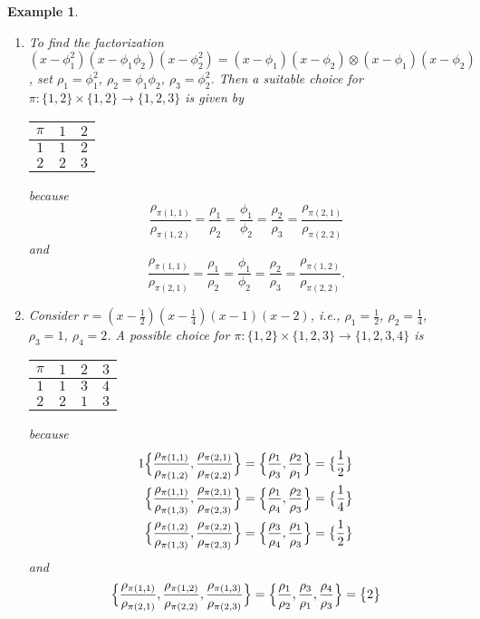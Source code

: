 \documentclass{sig-alternate}
\newtheorem{example}[theorem]{Example}
\begin{document}
\begin{example}
  \begin{enumerate}
  \item To find the factorization $(x-\phi_1^2)(x-\phi_1\phi_2)(x-\phi_2^2)=
    (x-\phi_1)(x-\phi_2)\otimes(x-\phi_1)(x-\phi_2)$,
    set $\rho_1=\phi_1^2$, $\rho_2=\phi_1\phi_2$, $\rho_3=\phi_2^2$. Then
    a suitable choice for $\pi\colon\{1,2\}\times\{1,2\}\to\{1,2,3\}$ is
    given by
    \begin{center}
      \begin{tabular}{c|cc}
        $\pi$ & $1$ & $2$ \\\hline
        $1$ & $1$ & $2$ \\
        $2$ & $2$ & $3$ 
      \end{tabular}
    \end{center}
    because
    \[
       \frac{\rho_{\pi(1,1)}}{\rho_{\pi(1,2)}}
       = \frac{\rho_1}{\rho_2} = \frac{\phi_1}{\phi_2}
       = \frac{\rho_2}{\rho_3}
       = \frac{\rho_{\pi(2,1)}}{\rho_{\pi(2,2)}}
    \]
    and
    \[
    \frac{\rho_{\pi(1,1)}}{\rho_{\pi(2,1)}}
    = \frac{\rho_1}{\rho_2} = \frac{\phi_1}{\phi_2}
    = \frac{\rho_2}{\rho_3}
    = \frac{\rho_{\pi(1,2)}}{\rho_{\pi(2,2)}}.
    \]
  \item
    Consider $r=(x-\tfrac12)(x-\tfrac14)(x-1)(x-2)$, i.e.,
    $\rho_1=\frac12$, $\rho_2=\frac14$, $\rho_3=1$, $\rho_4=2$. A possible
    choice for $\pi\colon\{1,2\}\times\{1,2,3\}\to\{1,2,3,4\}$ is
    \begin{center}
      \begin{tabular}{c|ccc}
        $\pi$ & $1$ & $2$ & $3$ \\\hline
          $1$ & $1$ & $3$ & $4$ \\
          $2$ & $2$ & $1$ & $3$
      \end{tabular}
    \end{center}
    because
    \begin{alignat*}1
      &\Bigl\{
      \frac{\rho_{\pi(1,1)}}{\rho_{\pi(1,2)}},
      \frac{\rho_{\pi(2,1)}}{\rho_{\pi(2,2)}}
      \Bigr\}=\Bigl\{
      \frac{\rho_1}{\rho_3},
      \frac{\rho_2}{\rho_1}
      \Bigr\}=\bigl\{\frac12\bigr\}\\
      &\Bigl\{
      \frac{\rho_{\pi(1,1)}}{\rho_{\pi(1,3)}},
      \frac{\rho_{\pi(2,1)}}{\rho_{\pi(2,3)}}
      \Bigr\}=\Bigl\{
      \frac{\rho_1}{\rho_4},
      \frac{\rho_2}{\rho_3}
      \Bigr\}=\bigl\{\frac14\bigr\}\\
      &\Bigl\{
      \frac{\rho_{\pi(1,2)}}{\rho_{\pi(1,3)}},
      \frac{\rho_{\pi(2,2)}}{\rho_{\pi(2,3)}}
      \Bigr\}=\Bigl\{
      \frac{\rho_3}{\rho_4},
      \frac{\rho_1}{\rho_3}
      \Bigr\}=\bigl\{\frac12\bigr\}
    \end{alignat*}
    and
    \[
    \Bigl\{
        \frac{\rho_{\pi(1,1)}}{\rho_{\pi(2,1)}},
        \frac{\rho_{\pi(1,2)}}{\rho_{\pi(2,2)}},
        \frac{\rho_{\pi(1,3)}}{\rho_{\pi(2,3)}}
        \Bigr\}=\Bigl\{
        \frac{\rho_1}{\rho_2},
        \frac{\rho_3}{\rho_1},
        \frac{\rho_4}{\rho_3}
        \Bigr\}=\bigl\{2\bigr\}
    \]
  \end{enumerate}
\end{example}
\end{document}
